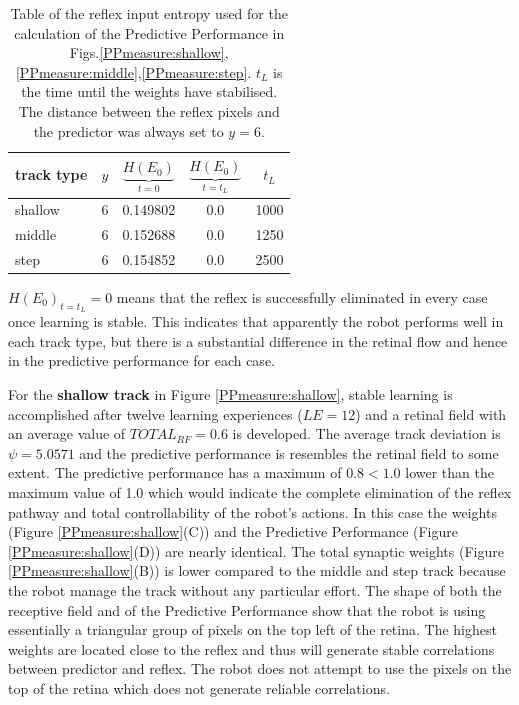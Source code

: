 \begin{table}[htbp]
\caption[Reflex input values for the 3 tracks]{Table of the reflex input entropy used for the calculation of the Predictive Performance
in Figs.\ref{PPmeasure:shallow},\ref{PPmeasure:middle},\ref{PPmeasure:step}.
$t_L$ is the time until the weights have stabilised. The distance between the reflex pixels
and the predictor was always set to $y=6$.\label{table:PPmeausure:TableReflexFullTracks}}
\begin{center}
  \begin{tabular}{| l | c | c | c | c | }
    \hline
    \textbf{track type}  & $y$  & $\underbrace{H(E_{0})}_{t=0} $ & $\underbrace{H(E_{0})}_{t=t_L} $ & $t_L$ \\ \hline
    shallow 		 & 6 	& 0.149802 	    & 0.0 & 1000 \\ \hline
    middle  		 & 6    & 0.152688 	    & 0.0 & 1250 \\ \hline
    step    		 & 6 	& 0.154852 	    & 0.0 & 2500 \\ \hline
  \end{tabular}
\end{center}
\end{table}

$H(E_{0})_{t=t_L}=0$ means that the reflex is successfully eliminated in every case once learning is stable.
This indicates that apparently the robot performs well in each track type, but there is a substantial difference 
in the retinal flow and hence in the predictive performance for each case.

For the \textbf{shallow track} in Figure \ref{PPmeasure:shallow}, stable learning is accomplished
after twelve learning experiences ($LE=12$) and a retinal field with an average value of $TOTAL_{RF}=0.6$ is developed.
The average track deviation is $\psi=5.0571$ and the predictive performance is resembles
the retinal field to some extent.
The predictive performance has a maximum of $0.8 < 1.0$ lower than
the maximum value of 1.0 which would indicate the complete elimination of the reflex
pathway and total controllability of the robot's actions.
In this case the weights (Figure \ref{PPmeasure:shallow}(C)) and the Predictive Performance (Figure \ref{PPmeasure:shallow}(D))
are nearly identical.
The total synaptic weights (Figure \ref{PPmeasure:shallow}(B)) is lower compared
to the middle and step track because the robot manage the track without any
particular effort.
The shape of both the receptive field and of the Predictive Performance show that
the robot is using essentially a triangular group of pixels on the top left of the retina.
The highest weights are located close to the reflex and thus will generate stable
correlations between predictor and reflex.
The robot does not attempt to use the pixels on the top of the retina which does
not generate reliable correlations.


